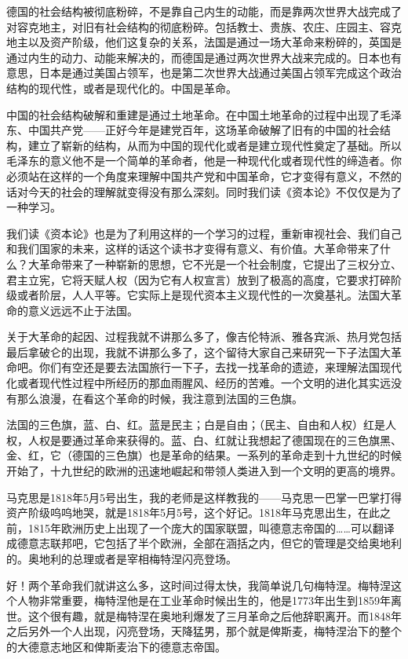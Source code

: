 \documentclass[UTF8, 12pt, a4paper]{ctexrep}
\begin{document}
德国的社会结构被彻底粉碎，不是靠自己内生的动能，而是靠两次世界大战完成了对容克地主，对旧有社会结构的彻底粉碎。包括教士、贵族、农庄、庄园主、容克地主以及资产阶级，他们这复杂的关系，法国是通过一场大革命来粉碎的，英国是通过内生的动力、动能来解决的，而德国是通过两次世界大战来完成的。日本也有意思，日本是通过美国占领军，也是第二次世界大战通过美国占领军完成这个政治结构的现代性，或者是现代化的。中国是革命。

中国的社会结构破解和重建是通过土地革命。在中国土地革命的过程中出现了毛泽东、中国共产党——正好今年是建党百年，这场革命破解了旧有的中国的社会结构，建立了崭新的结构，从而为中国的现代化或者是建立现代性奠定了基础。所以毛泽东的意义他不是一个简单的革命者，他是一种现代化或者现代性的缔造者。你必须站在这样的一个角度来理解中国共产党和中国革命，它才变得有意义，不然的话对今天的社会的理解就变得没有那么深刻。同时我们读《资本论》不仅仅是为了一种学习。

我们读《资本论》也是为了利用这样的一个学习的过程，重新审视社会、我们自己和我们国家的未来，这样的话这个读书才变得有意义、有价值。大革命带来了什么？大革命带来了一种崭新的思想，它不光是一个社会制度，它提出了三权分立、君主立宪，它将天赋人权（因为它有人权宣言）放到了极高的高度，它要求打碎阶级或者阶层，人人平等。它实际上是现代资本主义现代性的一次奠基礼。法国大革命的意义远远不止于法国。

关于大革命的起因、过程我就不讲那么多了，像吉伦特派、雅各宾派、热月党包括最后拿破仑的出现，我就不讲那么多了，这个留待大家自己来研究一下子法国大革命吧。你们有空还是要去法国旅行一下子，去找一找革命的遗迹，来理解法国现代化或者现代性过程中所经历的那血雨腥风、经历的苦难。一个文明的进化其实远没有那么浪漫，在看这个革命的时候，我注意到法国的三色旗。

法国的三色旗，蓝、白、红。蓝是民主；白是自由；（民主、自由和人权）红是人权，人权是要通过革命来获得的。蓝、白、红就让我想起了德国现在的三色旗黑、金、红，它（德国的三色旗）也是革命的结果。一系列的革命走到十九世纪的时候开始了，十九世纪的欧洲的迅速地崛起和带领人类进入到一个文明的更高的境界。

马克思是1818年5月5号出生，我的老师是这样教我的——马克思一巴掌一巴掌打得资产阶级呜呜地哭，就是1818年5月5号，这个好记。1818年马克思出生，在此之前，1815年欧洲历史上出现了一个庞大的国家联盟，叫德意志帝国的……可以翻译成德意志联邦吧，它包括了半个欧洲，全部在涵括之内，但它的管理是交给奥地利的。奥地利的总理或者是宰相梅特涅闪亮登场。

好！两个革命我们就讲这么多，这时间过得太快，我简单说几句梅特涅。梅特涅这个人物非常重要，梅特涅他是在工业革命时候出生的，他是1773年出生到1859年离世。这个很有趣，就是梅特涅在奥地利爆发了三月革命之后他辞职离开。而1848年之后另外一个人出现，闪亮登场，天降猛男，那个就是俾斯麦，梅特涅治下的整个的大德意志地区和俾斯麦治下的德意志帝国。
\end{document}
